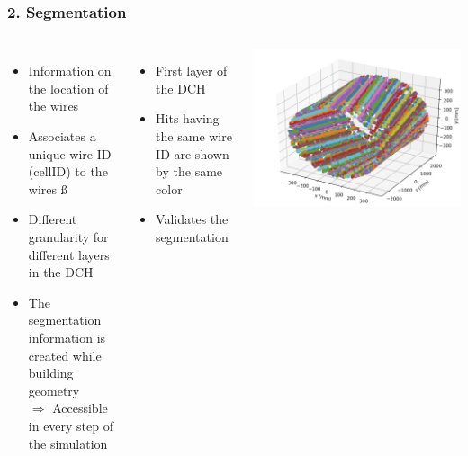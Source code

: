 \documentclass[hyperref={colorlinks=true,pdfpagelabels=false,linkcolor=black}, xcolor=dvipsnames,10pt]{beamer}
\begin{document}
\begin{frame}
	\frametitle{2. Segmentation}
		
	\begin{columns}[t]
		\begin{itemize}
		\item Information on the location of the wires \vspace{0.2cm}
		\item Associates a unique wire ID (cellID) to the wires \vspace{0.2cm}ß
		\item Different granularity for different layers in the DCH \vspace{0.2cm}
		\item The segmentation information is created while building geometry \vspace{0.2cm} \\
			$\Rightarrow$ Accessible in every step of the simulation
		\end{itemize}
	
		\begin{itemize}
		\item First layer of the DCH
		\item Hits having the same wire ID are shown by the same color
		\item Validates the segmentation
		\end{itemize}
		\centering
		\includegraphics[width=\textwidth]{../figures/allHits}
	\end{columns}
	
\end{frame}
\end{document}
